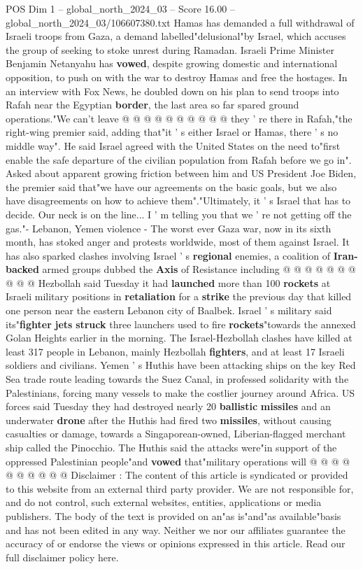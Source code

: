 \begin{textsample}{POS Dim 1 – global\_north\_2024\_03 – Score 16.00 – global\_north\_2024\_03/106607380.txt}
Hamas has demanded a full withdrawal of Israeli troops from Gaza, a demand labelled"delusional"by Israel, which accuses the group of seeking to stoke unrest during Ramadan.
Israeli Prime Minister Benjamin Netanyahu has \textbf{vowed}, despite growing domestic and international opposition, to push on with the war to destroy Hamas and free the hostages.
In an interview with Fox News, he doubled down on his plan to send troops into Rafah near the Egyptian \textbf{border}, the last area so far spared ground operations."We can't leave @ @ @ @ @ @ @ @ @ @ they ' re there in Rafah,"the right-wing premier said, adding that"it ' s either Israel or Hamas, there ' s no middle way".
He said Israel agreed with the United States on the need to"first enable the safe departure of the civilian population from Rafah before we go in".
Asked about apparent growing friction between him and US President Joe Biden, the premier said that"we have our agreements on the basic goals, but we also have disagreements on how to achieve them"."Ultimately, it ' s Israel that has to decide.
Our neck is on the line...
I ' m telling you that we ' re not getting off the gas."- Lebanon, Yemen violence - The worst ever Gaza war, now in its sixth month, has stoked anger and protests worldwide, most of them against Israel.
It has also sparked clashes involving Israel ' s \textbf{regional} enemies, a coalition of \textbf{Iran-backed} armed groups dubbed the \textbf{Axis} of Resistance including @ @ @ @ @ @ @ @ @ @ Hezbollah said Tuesday it had \textbf{launched} more than 100 \textbf{rockets} at Israeli military positions in \textbf{retaliation} for a \textbf{strike} the previous day that killed one person near the eastern Lebanon city of Baalbek.
Israel ' s military said its"\textbf{fighter} \textbf{jets} \textbf{struck} three launchers used to fire \textbf{rockets}"towards the annexed Golan Heights earlier in the morning.
The Israel-Hezbollah clashes have killed at least 317 people in Lebanon, mainly Hezbollah \textbf{fighters}, and at least 17 Israeli soldiers and civilians.
Yemen ' s Huthis have been attacking ships on the key Red Sea trade route leading towards the Suez Canal, in professed solidarity with the Palestinians, forcing many vessels to make the costlier journey around Africa.
US forces said Tuesday they had destroyed nearly 20 \textbf{ballistic} \textbf{missiles} and an underwater \textbf{drone} after the Huthis had fired two \textbf{missiles}, without causing casualties or damage, towards a Singaporean-owned, Liberian-flagged merchant ship called the Pinocchio.
The Huthis said the attacks were"in support of the oppressed Palestinian people"and \textbf{vowed} that"military operations will @ @ @ @ @ @ @ @ @ @ Disclaimer : The content of this article is syndicated or provided to this website from an external third party provider.
We are not responsible for, and do not control, such external websites, entities, applications or media publishers.
The body of the text is provided on an"as is"and"as available"basis and has not been edited in any way.
Neither we nor our affiliates guarantee the accuracy of or endorse the views or opinions expressed in this article.
Read our full disclaimer policy here.


\end{textsample}

